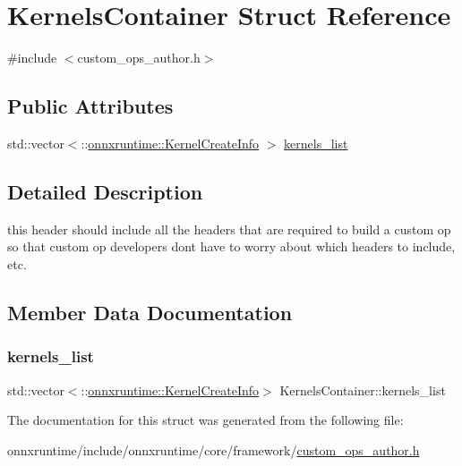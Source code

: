 \hypertarget{structKernelsContainer}{}\section{Kernels\+Container Struct Reference}
\label{structKernelsContainer}


{\ttfamily \#include $<$custom\+\_\+ops\+\_\+author.\+h$>$}

\subsection*{Public Attributes}
\begin{DoxyCompactItemize}
\item 
std\+::vector$<$\+::\mbox{\hyperlink{structonnxruntime_1_1KernelCreateInfo}{onnxruntime\+::\+Kernel\+Create\+Info}} $>$ \mbox{\hyperlink{structKernelsContainer_a45027a89552a89b0e804b773db09ee8b}{kernels\+\_\+list}}
\end{DoxyCompactItemize}


\subsection{Detailed Description}
this header should include all the headers that are required to build a custom op so that custom op developers don\textquotesingle{}t have to worry about which headers to include, etc. 

\subsection{Member Data Documentation}
\mbox{\label{structKernelsContainer_a45027a89552a89b0e804b773db09ee8b}} 
\subsubsection{\texorpdfstring{kernels\+\_\+list}{kernels\_list}}
{\footnotesize\ttfamily std\+::vector$<$\+::\mbox{\hyperlink{structonnxruntime_1_1KernelCreateInfo}{onnxruntime\+::\+Kernel\+Create\+Info}}$>$ Kernels\+Container\+::kernels\+\_\+list}



The documentation for this struct was generated from the following file\+:\begin{DoxyCompactItemize}
\item 
onnxruntime/include/onnxruntime/core/framework/\mbox{\hyperlink{custom__ops__author_8h}{custom\+\_\+ops\+\_\+author.\+h}}\end{DoxyCompactItemize}
